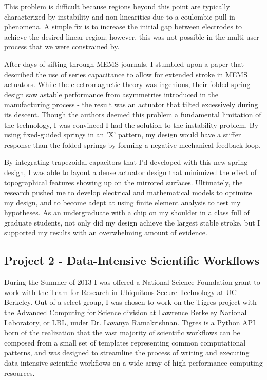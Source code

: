 \documentclass[journal]{IEEEtran}
\begin{document}
This problem is difficult because regions beyond this point are typically characterized by instability and non-linearities due to a coulombic pull-in phenomena. A simple fix is to increase the initial gap between electrodes to achieve the desired linear region; however, this was not possible in the multi-user process that we were constrained by. 

After days of sifting through MEMS journals, I stumbled upon a paper that described the use of series capacitance to allow for extended stroke in MEMS actuators. While the electromagnetic theory was ingenious, their folded spring design saw astable performance from asymmetries introduced in the manufacturing process - the result was an actuator that tilted excessively during its descent. Though the authors deemed this problem a fundamental limitation of the technology, I was convinced I had the solution to the instability problem. By using fixed-guided springs in an 'X' pattern, my design would have a stiffer response than the folded springs by forming a negative mechanical feedback loop. 

By integrating trapezoidal capacitors that I'd developed with this new spring design, I was able to layout a dense actuator design that minimized the effect of topographical features showing up on the mirrored surfaces. Ultimately, the research pushed me to develop electrical and mathematical models to optimize my design, and to become adept at using finite element analysis to test my hypotheses. As an undergraduate with a chip on my shoulder in a class full of graduate students, not only did my design achieve the largest stable stroke, but I supported my results with an overwhelming amount of evidence.  

\subsection{Project 2 - Data-Intensive Scientific Workflows}
During the Summer of 2013 I was offered a National Science Foundation grant to work with the Team for Research in Ubiquitous Secure Technology at UC Berkeley. Out of a select group, I was chosen to work on the Tigres project with the Advanced Computing for Science division at Lawrence Berkeley National Laboratory, or LBL, under Dr. Lavanya Ramakrishnan. Tigres is a Python API born of the realization that the vast majority of scientific workflows can be composed from a small set of templates representing common computational patterns, and was designed to streamline the process of writing and executing data-intensive scientific workflows on a wide array of high performance computing resources.
\end{document}

